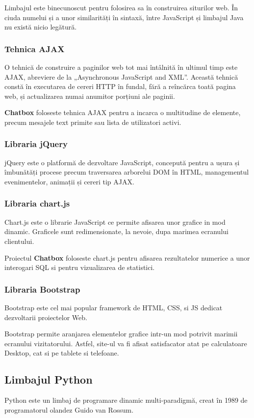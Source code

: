 \documentclass[12pt,a4paper]{article}
\begin{document}
Limbajul este binecunoscut pentru folosirea sa în construirea siturilor web. În ciuda numelui și a unor similarități în sintaxă, între JavaScript și limbajul Java nu există nicio legătură.

\subsubsection{Tehnica AJAX}
O tehnică de construire a paginilor web tot mai întâlnită în ultimul timp este AJAX, abreviere de la „Asynchronous JavaScript and XML”. Această tehnică constă în executarea de cereri HTTP în fundal, fără a reîncărca toată pagina web, și actualizarea numai anumitor porțiuni ale paginii.

\textbf{Chatbox} foloseste tehnica AJAX pentru a incarca o multitudine de
elemente, precum mesajele text primite sau lista de utilizatori activi. 

\subsubsection{Libraria jQuery}
jQuery\citep{jquery} este o platformă de dezvoltare JavaScript, concepută pentru a ușura și îmbunătăți procese precum traversarea arborelui DOM\citep{dom} în HTML, managementul evenimentelor, animații și cereri tip AJAX.

\subsubsection{Libraria chart.js}
Chart.js\cite{chartjs} este o librarie JavaScript ce permite afisarea 
unor grafice in mod dinamic. Graficele sunt redimensionate, la nevoie, dupa 
marimea ecranului clientului. 

Proiectul \textbf{Chatbox} foloseste chart.js pentru afisarea rezultatelor
numerice a unor interogari SQL si pentru vizualizarea de statistici.

\subsubsection{Libraria Bootstrap}
Bootstrap este cel mai popular framework de HTML, CSS, si JS dedicat dezvoltarii proiectelor Web. 

Bootstrap permite aranjarea elementelor grafice intr-un mod potrivit marimii ecranului vizitatorului. Astfel, site-ul va fi afisat satisfacator atat pe calculatoare Desktop, cat si pe tablete si telefoane.

\subsection{Limbajul Python}
Python este un limbaj de programare dinamic multi-paradigmă\cite{python}, creat în 1989 de programatorul olandez Guido van Rossum\cite{pythonWiki}.
\end{document}
